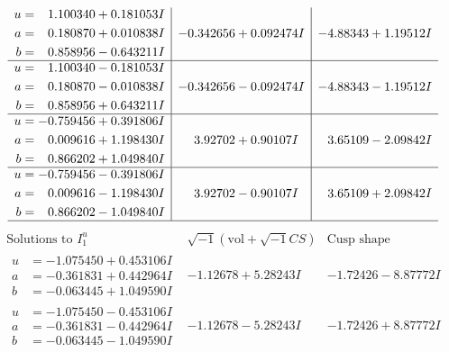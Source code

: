 \documentclass[1p]{elsarticle_modified}
\theoremstyle{definition}
\newcommand{\I}{\sqrt{-1}}
\begin{document}
$$\begin{array}{c|c|c}
\begin{aligned}
u &= \phantom{-}1.100340 + 0.181053 I \\
a &= \phantom{-}0.180870 + 0.010838 I \\
b &= \phantom{-}0.858956 - 0.643211 I\end{aligned}
 & -0.342656 + 0.092474 I & -4.88343 + 1.19512 I \\ \hline\begin{aligned}
u &= \phantom{-}1.100340 - 0.181053 I \\
a &= \phantom{-}0.180870 - 0.010838 I \\
b &= \phantom{-}0.858956 + 0.643211 I\end{aligned}
 & -0.342656 - 0.092474 I & -4.88343 - 1.19512 I \\ \hline\begin{aligned}
u &= -0.759456 + 0.391806 I \\
a &= \phantom{-}0.009616 + 1.198430 I \\
b &= \phantom{-}0.866202 + 1.049840 I\end{aligned}
 & \phantom{-}3.92702 + 0.90107 I & \phantom{-}3.65109 - 2.09842 I \\ \hline\begin{aligned}
u &= -0.759456 - 0.391806 I \\
a &= \phantom{-}0.009616 - 1.198430 I \\
b &= \phantom{-}0.866202 - 1.049840 I\end{aligned}
 & \phantom{-}3.92702 - 0.90107 I & \phantom{-}3.65109 + 2.09842 I\\
 \hline 
 \end{array}$$\newpage$$\begin{array}{c|c|c}  
\text{Solutions to }I^u_{1}& \I (\text{vol} + \sqrt{-1}CS) & \text{Cusp shape}\\
 \hline 
\begin{aligned}
u &= -1.075450 + 0.453106 I \\
a &= -0.361831 + 0.442964 I \\
b &= -0.063445 + 1.049590 I\end{aligned}
 & -1.12678 + 5.28243 I & -1.72426 - 8.87772 I \\ \hline\begin{aligned}
u &= -1.075450 - 0.453106 I \\
a &= -0.361831 - 0.442964 I \\
b &= -0.063445 - 1.049590 I\end{aligned}
 & -1.12678 - 5.28243 I & -1.72426 + 8.87772 I \\ \hline\begin{aligned}

\end{aligned}
\end{array}$$
\end{document}
